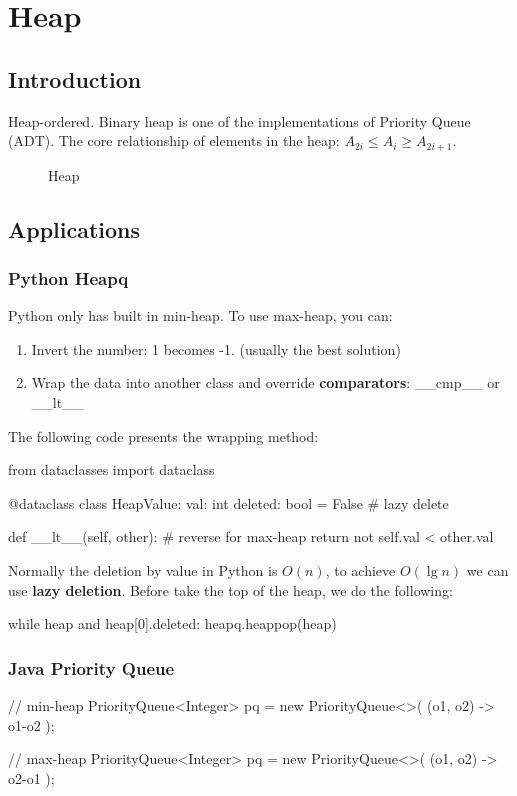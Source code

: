 \chapter{Heap}

\section{Introduction}
Heap-ordered. Binary heap is one of the implementations of Priority Queue (ADT). The core relationship of elements in the heap:
$A_{2i} \leq A_{i} \geq A_{2i+1}$.


\begin{figure}[hbtp]
\centering
{}
\caption{Heap}
\label{fig:heap}
\end{figure}

\section{Applications}
\subsection{Python Heapq}
Python only has built in min-heap. To use max-heap, you can: 
\begin{enumerate}
\item Invert the number: 1 becomes -1.
(usually the best solution)\item Wrap the data into another class and override \textbf{comparators}: \_\_cmp\_\_ or \_\_lt\_\_
\end{enumerate}

The following code presents the wrapping method:
\begin{python}
from dataclasses import dataclass

@dataclass
class HeapValue:
    val: int
    deleted: bool = False  # lazy delete

    def __lt__(self, other):  # reverse for max-heap
        return not self.val < other.val
\end{python}

Normally the deletion by value in Python is $O(n)$, to achieve $O(\lg n)$ we can use \textbf{lazy deletion}. Before take the top of the heap, we do the following:
\begin{python}
while heap and heap[0].deleted:
    heapq.heappop(heap)
\end{python}
\subsection{Java Priority Queue}
\begin{java}
// min-heap
PriorityQueue<Integer> pq = new PriorityQueue<>(
    (o1, o2) -> o1-o2
);

// max-heap
PriorityQueue<Integer> pq = new PriorityQueue<>(
    (o1, o2) -> o2-o1
);
\end{java}
